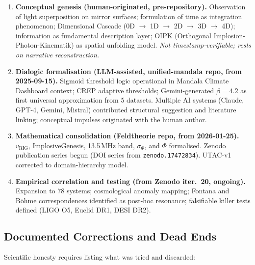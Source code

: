 \documentclass[12pt,a4paper]{article}
\theoremstyle{definition}
\newcommand{\sigphi}{\sigma_{\Phi}}
\newcommand{\vrig}{v_{\mathrm{RIG}}}
\newcommand{\PhiAFET}{\Phi}      %
\begin{document}
\begin{enumerate}[leftmargin=2em, label=\textbf{Phase \Roman*.}]
  \item \textbf{Conceptual genesis (human-originated, pre-repository).}
        Observation of light superposition on mirror surfaces; formulation of
        time as integration phenomenon; Dimensional Cascade
        (0D $\to$ 1D $\to$ 2D $\to$ 3D $\to$ 4D);
        information as fundamental description layer; OIPK (Orthogonal
        Implosion-Photon-Kinematik) as spatial unfolding model.
        \textit{Not timestamp-verifiable; rests on narrative reconstruction.}

  \item \textbf{Dialogic formalisation (LLM-assisted, unified-mandala repo,
        from 2025-09-15).}
        Sigmoid threshold logic operational in Mandala Climate Dashboard context;
        CREP adaptive thresholds; Gemini-generated $\beta = 4.2$ as
        first universal approximation from 5 datasets.
        Multiple AI systems (Claude, GPT-4, Gemini, Mistral) contributed
        structural suggestion and literature linking;
        conceptual impulses originated with the human author.

  \item \textbf{Mathematical consolidation (Feldtheorie repo, from 2026-01-25).}
        $\vrig$, ImplosiveGenesis, 13.5\,MHz band, $\sigphi$, and $\PhiAFET$
        formalised. Zenodo publication series begun (DOI series from
        \texttt{zenodo.17472834}). UTAC-v1 corrected to domain-hierarchy model.

  \item \textbf{Empirical correlation and testing (from Zenodo iter.\ 20,
        ongoing).}
        Expansion to 78 systems; cosmological anomaly mapping;
        Fontana and Böhme correspondences identified as post-hoc resonance;
        falsifiable killer tests defined (LIGO O5, Euclid DR1, DESI DR2).
\end{enumerate}

\subsection*{Documented Corrections and Dead Ends}

Scientific honesty requires listing what was tried and discarded:
\end{document}
